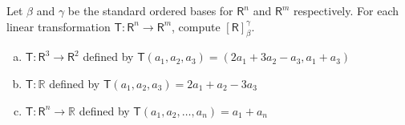 Let $\beta$ and $\gamma$ be the standard ordered bases for
$\mathsf{R}^n$ and $\mathsf{R}^m$ respectively. For each linear
transformation $\mathsf{T}\colon\mathsf{R}^n\to\mathsf{R}^m$, compute $\left[\mathsf{R}\right]^\gamma_\beta$.
\begin{enumerate}[(a)]
\addtocounter{enumii}{1}
\item $\mathsf{T}\colon\mathsf{R}^3\to \mathsf{R}^2$ defined by
  $\mathsf{T}(a_1,a_2,a_3) = (2a_1 + 3a_2 -a_3, a_1 +a_3)$
\item $\mathsf{T}\colon\mathbb{R}$ defined by $\mathsf{T}(a_1,a_2,a_3)
  = 2a_1 + a_2 -3a_3$
\addtocounter{enumii}{3}
\item $\mathsf{T}\colon\mathsf{R}^n \to \mathbb{R}$ defined by
  $\mathsf{T}(a_1,a_2,\dots,a_n) = a_1 + a_n$
\end{enumerate}
